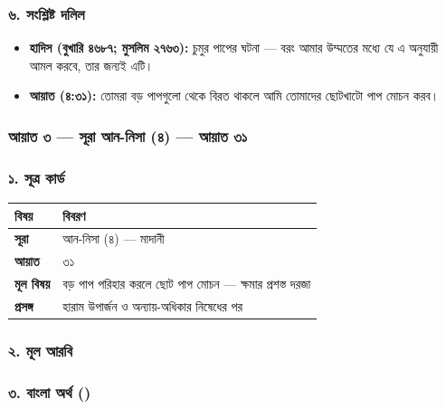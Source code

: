 \subsubsection*{৬. সংশ্লিষ্ট দলিল}

\begin{itemize}
\item \textbf{হাদিস (বুখারি ৪৬৮৭; মুসলিম ২৭৬৩):} চুমুর পাপের ঘটনা — বরং আমার উম্মতের মধ্যে যে এ অনুযায়ী আমল করবে, তার জন্যই এটি।
\item \textbf{আয়াত (৪:৩১):} তোমরা বড় পাপগুলো থেকে বিরত থাকলে আমি তোমাদের ছোটখাটো পাপ মোচন করব।
\end{itemize}
\subsubsection*{আয়াত ৩ — সূরা আন-নিসা (৪) — আয়াত ৩১}

\subsubsection*{১. সূত্র কার্ড}

\begin{table}[h]\centering\small
\begin{tabular}{ll}
বিষয় & বিবরণ \\
\hline
\textbf{সূরা} & আন-নিসা (৪) — মাদানী \\
\textbf{আয়াত} & ৩১ \\
\textbf{মূল বিষয়} & বড় পাপ পরিহার করলে ছোট পাপ মোচন — ক্ষমার প্রশস্ত দরজা \\
\textbf{প্রসঙ্গ} & হারাম উপার্জন ও অন্যায়-অধিকার নিষেধের পর \\
\hline
\end{tabular}
\end{table}

\subsubsection*{২. মূল আরবি}

\begin{center}\end{center}

\subsubsection*{৩. বাংলা অর্থ ()}

